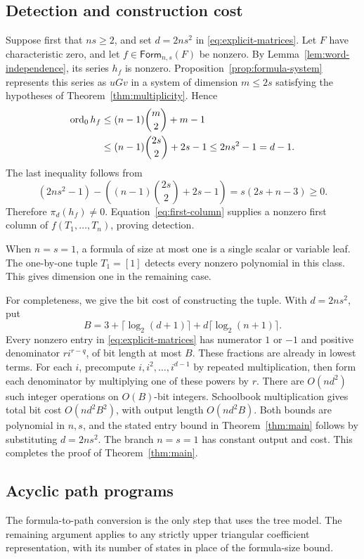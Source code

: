 \subsection{Detection and construction cost}

Suppose first that $ns\ge2$, and set $d=2ns^2$ in
\eqref{eq:explicit-matrices}. Let $F$ have characteristic zero, and let
$f\in\mathsf{Form}_{n,s}(F)$ be nonzero. By
Lemma~\ref{lem:word-independence}, its series $h_f$ is nonzero.
Proposition~\ref{prop:formula-system} represents this series as $uGv$
in a system of dimension $m\le2s$ satisfying the hypotheses of
Theorem~\ref{thm:multiplicity}. Hence
\begin{align*}
 \operatorname{ord}_0h_f
 &\le (n-1)\binom m2+m-1\\
 &\le (n-1)\binom{2s}{2}+2s-1
 \le 2ns^2-1=d-1.
\end{align*}
The last inequality follows from
\[
 (2ns^2-1)-\left((n-1)\binom{2s}{2}+2s-1\right)
 =s(2s+n-3)\ge0.
\]
Therefore $\pi_d(h_f)\ne0$. Equation~\eqref{eq:first-column} supplies a
nonzero first column of $f(T_1,\ldots,T_n)$, proving detection.

When $n=s=1$, a formula of size at most one is a single scalar or variable
leaf. The one-by-one tuple $T_1=[1]$ detects every nonzero polynomial in this
class. This gives dimension one in the remaining case.

For completeness, we give the bit cost of constructing the tuple.
With $d=2ns^2$, put
\[
 B=3+\lceil\log_2(d+1)\rceil
       +d\lceil\log_2(n+1)\rceil.
\]
Every nonzero entry in \eqref{eq:explicit-matrices} has numerator $1$ or $-1$
and positive denominator $r i^{r-q}$, of bit length at most $B$.
These fractions are already in lowest terms. For each $i$, precompute
$i,i^2,\ldots,i^{d-1}$ by repeated multiplication, then form each denominator
by multiplying one of these powers by $r$. There are $O(nd^2)$ such integer
operations on $O(B)$-bit integers. Schoolbook multiplication gives total
bit cost $O(nd^2B^2)$, with output length $O(nd^2B)$.
Both bounds are polynomial in $n,s$, and the stated entry bound in
Theorem~\ref{thm:main} follows by substituting $d=2ns^2$.
The branch $n=s=1$ has constant output and cost.
This completes the proof of Theorem~\ref{thm:main}.

\subsection{Acyclic path programs}

The formula-to-path conversion is the only step that uses the tree model.
The remaining argument applies to any strictly upper triangular coefficient
representation, with its number of states in place of the formula-size bound.

